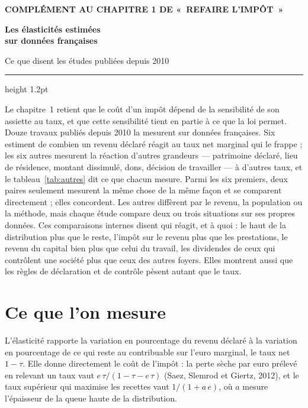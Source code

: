 \documentclass[11pt,a4paper]{article}
\begin{document}
\addto\captionsfrench{\renewcommand{\figurename}{Figure}%
  \renewcommand{\tablename}{Tableau}}
\renewcommand{\figurename}{Figure}\renewcommand{\tablename}{Tableau}

\thispagestyle{empty}
{\footnotesize\color{ocre}\bfseries COMPLÉMENT AU CHAPITRE 1 DE «~REFAIRE L'IMPÔT~»\par}
\vspace{8pt}
{\raggedright\fontsize{21}{25}\selectfont\bfseries Les élasticités estimées\\ sur données françaises\par}
\vspace{8pt}
{\large Ce que disent les études publiées depuis 2010\par}
\vspace{10pt}
{\color{bleu}\hrule height 1.2pt}
\vspace{10pt}

Le chapitre~1 retient que le coût d'un impôt dépend de la sensibilité de son assiette au taux, et
que cette sensibilité tient en partie à ce que la loi permet. Douze travaux publiés depuis 2010 la
mesurent sur données françaises. Six estiment de combien un revenu déclaré réagit au taux net
marginal qui le frappe ; les six autres mesurent la réaction d'autres grandeurs --- patrimoine
déclaré, lieu de résidence, montant dissimulé, dons, décision de travailler --- à d'autres taux, et
le tableau~\ref{tab:autres} dit ce que chacun mesure. Parmi les six premiers, deux paires seulement
mesurent la même chose de la même façon et se comparent directement ; elles concordent. Les autres
diffèrent par le revenu, la population ou la méthode, mais chaque étude compare deux ou trois
situations sur ses propres données. Ces comparaisons internes disent qui réagit, et à quoi : le
haut de la distribution plus que le reste, l'impôt sur le revenu plus que les prestations, le revenu
du capital bien plus que celui du travail, les dividendes de ceux qui contrôlent une société plus
que ceux des autres foyers. Elles montrent aussi que les règles de déclaration et de contrôle pèsent
autant que le taux.

\section{Ce que l'on mesure}

L'élasticité rapporte la variation en pourcentage du revenu déclaré à la variation en pourcentage
de ce qui reste au contribuable sur l'euro marginal, le taux net $1-\tau$. Elle donne directement
le coût de l'impôt : la perte sèche par euro prélevé en relevant un taux vaut
$e\,\tau/(1-\tau-e\,\tau)$ (Saez, Slemrod et Giertz, 2012), et le taux supérieur qui maximise les
recettes vaut $1/(1+a\,e)$, où $a$ mesure l'épaisseur de la queue haute de la distribution.
\end{document}
